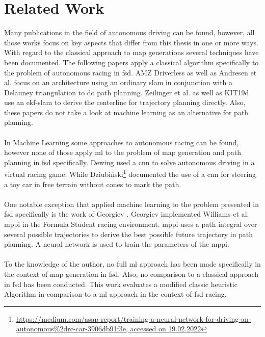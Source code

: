\section{Related Work}
Many publications in the field of autonomous driving can be found, however, all those works focus on key aspects that differ from this thesis in one or more ways. \\
With regard to the classical approach to map generations several techniques have been documented. The following papers apply a classical algorithm specifically to the problem of autonomous racing in \ac{fsd}. AMZ Driverless \cite{kabzan2019amz} as well as Andresen et al. \cite{andresen2020} focus on an architecture using an ordinary \ac{slam} in conjunction with a Delauney triangulation to do path planning. Zeilinger et al. \cite{zeilinger2017} as well as KIT19d \cite{nekkah2020} use an \ac{ekf}-\ac{slam} to derive the centerline for trajectory planning directly. Also, these papers do not take a look at machine learning as an alternative for path planning.\\
\\
In Machine Learning some approaches to autonomous racing can be found, however none of those apply \ac{ml} to the problem of map generation and path planning in \ac{fsd} specifically. Dewing \cite{DewingNowTI}
used a \ac{cnn} to solve autonomous driving in a virtual racing game. While Dziubiński\footnote{\url{https://medium.com/asap-report/training-a-neural-network-for-driving-an-autonomous\%2drc-car-3906db91f3e, accessed on 19.02.2022}} documented the use of a \ac{cnn} for steering a toy car in free terrain without cones to mark the path.\\
\\
One notable exception that applied machine learning to the problem presented in \ac{fsd} specifically is the work of Georgiev \cite{georgiev2019}. Georgiev implemented Williams et al. \cite{williams2016} \ac{mppi} in the Formula Student racing environment. \ac{mppi} uses a path integral over several possible trajectories to derive the best possible future trajectory in path planning. A neural network is used to train the parameters of the \ac{mppi}.\\
\\
To the knowledge of the author, no full \ac{ml} approach has been made specifically in the context of map generation in \ac{fsd}. Also, no comparison to a classical approach in \ac{fsd} has been conducted. This work evaluates a modified classic heuristic Algorithm in comparison to a \ac{ml} approach in the context of \ac{fsd} racing.

